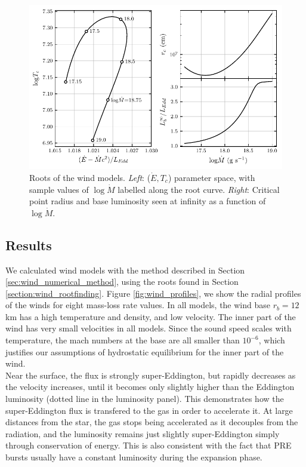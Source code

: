\documentclass[../main.tex]{subfiles}
\newcommand{\Mdot}{\dot{M}}
\newcommand{\Edot}{\dot{E}}
\begin{document}
\begin{figure}
    \centering
    \includegraphics[width=\textwidth]{figures/wind_roots.pdf}
    \caption{Roots of the wind models. \textit{Left}: ($\Edot,T_c$) parameter space, with sample values of $\log\Mdot$ labelled along the root curve. \textit{Right}: Critical point radius and base luminosity seen at infinity as a function of $\log\Mdot$.}
    \label{fig:wind_roots}
\end{figure}


\subsection{Results}\label{sec:wind_results}

We calculated wind models with the method described in Section \ref{sec:wind_numerical_method}, using the roots found in Section \ref{section:wind_rootfinding}. Figure \ref{fig:wind_profiles}, we show the radial profiles of the winds for eight mass-loss rate values. In all models, the wind base $r_b=12$ km has a high temperature and density, and low velocity. The inner part of the wind has very small velocities in all models. Since the sound speed scales with temperature, the mach numbers at the base are all smaller than $10
^{-6}$, which justifies our assumptions of hydrostatic equilibrium for the inner part of the wind.  \\

Near the surface, the flux is strongly super-Eddington, but rapidly decreases as the velocity increases, until it becomes only slightly higher than the Eddington luminosity (dotted line in the luminosity panel). This demonstrates how the super-Eddington flux is transfered to the gas in order to accelerate it. At large distances from the star, the gas stops being accelerated as it decouples from the radiation, and the luminosity remains just slightly super-Eddington simply through conservation of energy. This is also consistent with the fact that PRE bursts usually have a constant luminosity during the expansion phase. \\
\end{document}
